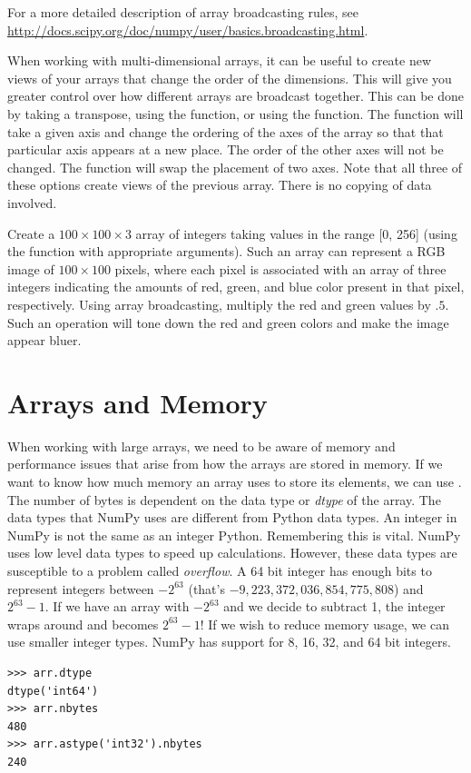 For a more detailed description of array broadcasting rules, see \url{http://docs.scipy.org/doc/numpy/user/basics.broadcasting.html}.

When working with multi-dimensional arrays, it can be useful to create new views of your arrays that change the order of the dimensions.
This will give you greater control over how different arrays are broadcast together.
This can be done by taking a transpose, using the  function, or using the  function.
The  function will take a given axis and change the ordering of the axes of the array so that that particular axis appears at a new place.
The order of the other axes will not be changed.
The  function will swap the placement of two axes.
Note that all three of these options create views of the previous array.
There is no copying of data involved.

\begin{problem}
Create a $100\times100\times3$ array of integers taking values in the range [0, 256] 
(using the function  with appropriate arguments). 
Such an array can represent a RGB image of $100\times100$ pixels, where each pixel 
is associated with an array of three integers indicating the amounts of red, green, and 
blue color present in that pixel, respectively. Using array broadcasting, multiply the 
red and green values by $.5$. Such an operation will tone down the red and green colors 
and make the image appear bluer. 
\end{problem}

\section*{Arrays and Memory}
When working with large arrays, we need to be aware of memory and performance issues that 
arise from how the arrays are stored in memory.
If we want to know how much memory an array uses to store its elements, we can use 
.
The number of bytes is dependent on the data type or \emph{dtype} of the array.
The data types that NumPy uses are different from Python data types.
An integer in NumPy is not the same as an integer Python.
Remembering this is vital.
NumPy uses low level data types to speed up calculations.
However, these data types are susceptible to a problem called \emph{overflow}.
A 64 bit integer has enough bits to represent integers between $-2^{63}$ (that's 
$-9,223,372,036,854,775,808$) and $2^{63} - 1$.
If we have an array with $-2^{63}$ and we decide to subtract 1, the integer wraps around 
and becomes $2^{63} - 1$!  If we wish to reduce memory usage, we can use smaller integer 
types.
NumPy has support for 8, 16, 32, and 64 bit integers.
\begin{lstlisting}
>>> arr.dtype
dtype('int64')
>>> arr.nbytes
480
>>> arr.astype('int32').nbytes
240
\end{lstlisting}

